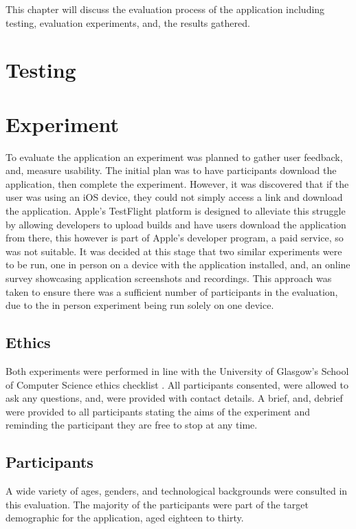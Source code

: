 This chapter will discuss the evaluation process of the application including testing, evaluation experiments, and, the results gathered.

\section{Testing}


\section{Experiment}
To evaluate the application an experiment was planned to gather user feedback, and, measure usability. The initial plan was to have participants download the application, then complete the experiment. However, it was discovered that if the user was using an iOS device, they could not simply access a link and download the application. Apple's TestFlight platform is designed to alleviate this struggle by allowing developers to upload builds and have users download the application from there, this however is part of Apple's developer program, a paid service, so was not suitable. It was decided at this stage that two similar experiments were to be run, one in person on a device with the application installed, and, an online survey showcasing application screenshots and recordings. This approach was taken to ensure there was a sufficient number of participants in the evaluation, due to the in person experiment being run solely on one device. 

\subsection*{Ethics}
Both experiments were performed in line with the University of Glasgow's School of Computer Science ethics checklist \cite{ethics}. All participants consented, were allowed to ask any questions, and, were provided with contact details. A brief,  and, debrief were provided to all participants stating the aims of the experiment and reminding the participant they are free to stop at any time.

\subsection*{Participants}
A wide variety of ages, genders, and technological backgrounds were consulted in this evaluation. The majority of the participants were part of the target demographic for the application, aged eighteen to thirty. 

